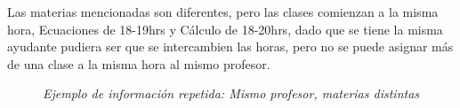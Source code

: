 \begin{itemize}
Las materias mencionadas son diferentes, pero las clases comienzan a la misma hora, Ecuaciones de 18-19hrs y Cálculo de 18-20hrs, dado que se tiene la misma ayudante pudiera ser que se intercambien las horas, pero no se puede asignar más de una clase a la misma hora al mismo profesor.

\begin{figure}[H]
	\centering
	\caption{\textit{Ejemplo de información repetida: Mismo profesor, materias distintas}}
\end{figure}	

%	



\end{itemize}

